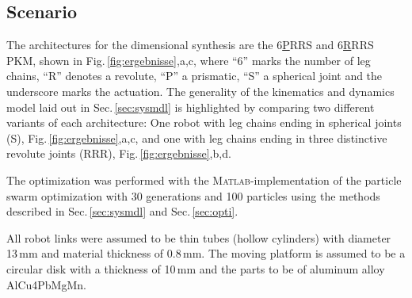 \documentclass[fleqn,a4paper,10pt]{article}
\begin{document}
\begin{multicols}{2}




\subsection{Scenario}
\label{sec:res_scenario}

The architectures for the dimensional synthesis are the 6\underline{P}RRS and 6\underline{R}RRS PKM, shown in Fig.\,\ref{fig:ergebnisse},a,c, where ``6'' marks the number of leg chains, ``R'' denotes a revolute, ``P'' a prismatic, ``S'' a spherical joint and the underscore marks the actuation.
The generality of the kinematics and dynamics model laid out in Sec.\,\ref{sec:sysmdl} is highlighted by comparing two different variants of each architecture: One robot with leg chains ending in spherical joints (S), Fig.\,\ref{fig:ergebnisse},a,c, and one with leg chains ending in three distinctive revolute joints (RRR), Fig.\,\ref{fig:ergebnisse},b,d.

The optimization was performed with the \textsc{Matlab}-implementation of the particle swarm optimization \cite{MatlabPSO} with 30 generations and 100 particles using the methods described in Sec.\,\ref{sec:sysmdl} and Sec.\,\ref{sec:opti}.

All robot links were assumed to be thin tubes (hollow cylinders) with diameter 13\,mm and material thickness of 0.8\,mm.
The moving platform is assumed to be a circular disk with a thickness of 10\,mm and the parts to be of aluminum alloy AlCu4PbMgMn.


\end{multicols}
\end{document}
